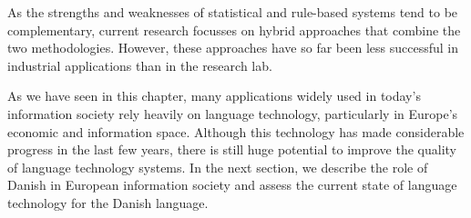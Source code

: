 \documentclass[]{../../metanetpaper}
\begin{document}
\begin{multicols}{2}

As the strengths and weaknesses of statistical and rule-based systems tend to be complementary, current research focusses on hybrid approaches that combine the two methodologies. However, these approaches have so far been less successful in industrial applications than in the research lab. 

As we have seen in this chapter, many applications widely used in today’s information society rely heavily on language technology, particularly in Europe’s economic and information space. Although this technology has made considerable progress in the last few years, there is still huge potential to improve the quality of language technology systems. In the next section, we describe the role of Danish in European information society and assess the current state of language technology for the Danish language.
\end{multicols}

\clearpage

\end{document}
